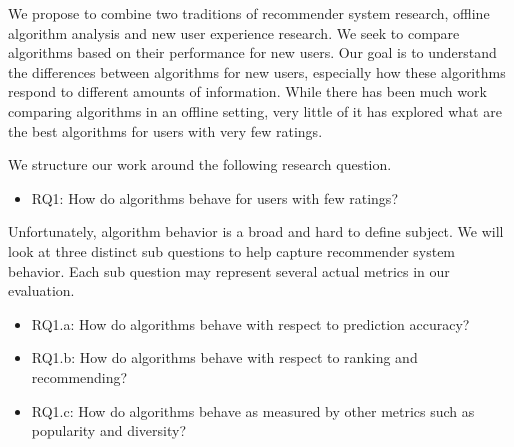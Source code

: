 \documentclass[letterpaper]{sig-alternate}
\begin{document}
  We propose to combine two traditions of recommender system research, offline algorithm analysis and new user experience research.
  We seek to compare algorithms based on their performance for new users.
  Our goal is to understand the differences between algorithms for new users, especially how these algorithms respond to different amounts of information.
  While there has been much work comparing algorithms in an offline setting, very little of it has explored what are the best algorithms for users with very few ratings.


  We structure our work around the following research question.
  \begin{itemize}
    \item RQ1: How do algorithms behave for users with few ratings?
  \end{itemize}
  Unfortunately, algorithm behavior is a broad and hard to define subject.
  We will look at three distinct sub questions to help capture recommender system behavior.
  Each sub question may represent several actual metrics in our evaluation.

      
  \begin{itemize}
  \item RQ1.a: How do algorithms behave with respect to prediction accuracy?
  \item RQ1.b: How do algorithms behave with respect to ranking and recommending?
  \item RQ1.c: How do algorithms behave as measured by other metrics such as popularity and diversity?
  \end{itemize}
\end{document}
